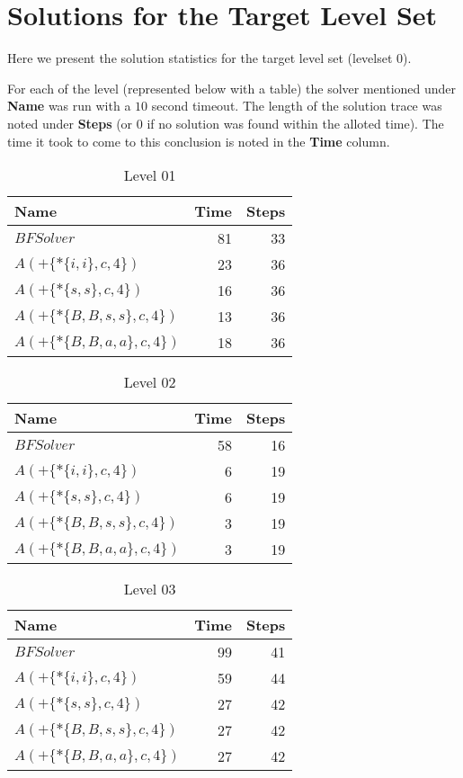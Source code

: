 \chapter{Solutions for the Target Level Set}
\label{app:solutions}

Here we present the solution statistics for the target level set
(levelset 0).

For each of the level (represented below with a table) the solver
mentioned under \textbf{Name} was run with a $10$ second timeout.  The
length of the solution trace was noted under \textbf{Steps} (or $0$ if
no solution was found within the alloted time). The time it took to
come to this conclusion is noted in the \textbf{Time} column.

\begin{table}
  \centering
  \begin{tabular}{lrr}
    \toprule
    \textbf{ Name } & \textbf{ Time } & \textbf{ Steps }\\\midrule
    $BFSolver$ & 81 & 33 \\
    $A(+\{*\{i,i\},c,4\})$ & 23 & 36 \\
    $A(+\{*\{s,s\},c,4\})$ & 16 & 36 \\
    $A(+\{*\{B,B,s,s\},c,4\})$ & 13 & 36 \\
    $A(+\{*\{B,B,a,a\},c,4\})$ & 18 & 36 \\
    \bottomrule
  \end{tabular}
  \caption{Level 01}
  \label{tab:level_01}
\end{table}

\begin{table} \centering \begin{tabular}{lrr}\toprule \textbf{ Name }
    & \textbf{ Time } & \textbf{ Steps }\\\midrule
    $BFSolver$ & 58 & 16 \\
    $A(+\{*\{i,i\},c,4\})$ & 6 & 19 \\
    $A(+\{*\{s,s\},c,4\})$ & 6 & 19 \\
    $A(+\{*\{B,B,s,s\},c,4\})$ & 3 & 19 \\
    $A(+\{*\{B,B,a,a\},c,4\})$ & 3 & 19 \\
    \bottomrule \end{tabular} \caption{Level 02}
  \label{tab:level_02} \end{table}

\begin{table} \centering \begin{tabular}{lrr}\toprule \textbf{ Name }
    & \textbf{ Time } & \textbf{ Steps }\\\midrule
    $BFSolver$ & 99 & 41 \\
    $A(+\{*\{i,i\},c,4\})$ & 59 & 44 \\
    $A(+\{*\{s,s\},c,4\})$ & 27 & 42 \\
    $A(+\{*\{B,B,s,s\},c,4\})$ & 27 & 42 \\
    $A(+\{*\{B,B,a,a\},c,4\})$ & 27 & 42 \\
    \bottomrule \end{tabular} \caption{Level 03}
  \label{tab:level_03} \end{table}

